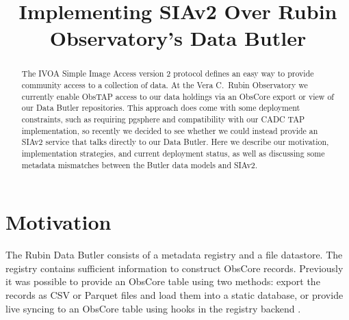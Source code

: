 \documentclass[11pt,twoside]{article}
\begin{document}
\title{Implementing SIAv2 Over Rubin Observatory's Data Butler}




\begin{abstract}
The IVOA Simple Image Access version 2 protocol defines an easy way to provide community access to a collection of data.
At the Vera C.\ Rubin Observatory we currently enable ObsTAP access to our data holdings via an ObsCore export or view of our Data Butler repositories.
This approach does come with some deployment constraints, such as requiring pgsphere and compatibility with our CADC TAP implementation, so recently we decided to see whether we could instead provide an SIAv2 service that talks directly to our Data Butler.
Here we describe our motivation, implementation strategies, and current deployment status, as well as discussing some metadata mismatches between the Butler data models and SIAv2.
\end{abstract}



\section{Motivation}

The Rubin Data Butler \citep{2022SPIE12189E..11J} consists of a metadata registry and a file datastore.
The registry contains sufficient information to construct ObsCore records.
Previously it was possible to provide an ObsCore table using two methods: export the records as CSV or Parquet files and load them into a static database, or provide live syncing to an ObsCore table using hooks in the registry backend \citep{DMTN-236}.
\end{document}

